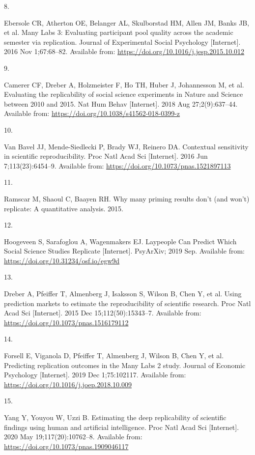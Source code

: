 \documentclass[
  english,
  a4paper,
]{article}
\newlength{\cslhangindent}
\newlength{\csllabelwidth}
\newenvironment{CSLReferences}[2] %
{\begin{list}{}{%
			\setlength{\itemindent}{0pt}
			\setlength{\leftmargin}{0pt}
			\setlength{\parsep}{0pt}
			\ifodd #1
			\setlength{\leftmargin}{\cslhangindent}
			\setlength{\itemindent}{-1\cslhangindent}
			\fi
			\setlength{\itemsep}{#2\baselineskip}}}
	{\end{list}}
\newcommand{\CSLLeftMargin}[1]{\parbox[t]{\csllabelwidth}{\strut#1\strut}}
\newcommand{\CSLRightInline}[1]{\parbox[t]{\linewidth - \csllabelwidth}{\strut#1\strut}}
\begin{document}
\begin{CSLReferences}{0}{1}
\CSLLeftMargin{8. }%
\CSLRightInline{Ebersole CR, Atherton OE, Belanger AL, Skulborstad HM, Allen JM, Banks JB, et al. Many {Labs} 3: {Evaluating} participant pool quality across the academic semester via replication. Journal of Experimental Social Psychology {[}Internet{]}. 2016 Nov 1;67:68--82. Available from: \url{https://doi.org/10.1016/j.jesp.2015.10.012}}

\CSLLeftMargin{9. }%
\CSLRightInline{Camerer CF, Dreber A, Holzmeister F, Ho TH, Huber J, Johannesson M, et al. Evaluating the replicability of social science experiments in {Nature} and {Science} between 2010 and 2015. Nat Hum Behav {[}Internet{]}. 2018 Aug 27;2(9):637--44. Available from: \url{https://doi.org/10.1038/s41562-018-0399-z}}

\CSLLeftMargin{10. }%
\CSLRightInline{Van Bavel JJ, Mende-Siedlecki P, Brady WJ, Reinero DA. Contextual sensitivity in scientific reproducibility. Proc Natl Acad Sci {[}Internet{]}. 2016 Jun 7;113(23):6454--9. Available from: \url{https://doi.org/10.1073/pnas.1521897113}}

\CSLLeftMargin{11. }%
\CSLRightInline{Ramscar M, Shaoul C, Baayen RH. Why many priming results don't (and won't) replicate: {A} quantitative analysis. 2015. }

\CSLLeftMargin{12. }%
\CSLRightInline{Hoogeveen S, Sarafoglou A, Wagenmakers EJ. Laypeople {Can Predict Which Social Science Studies Replicate} {[}Internet{]}. {PsyArXiv}; 2019 Sep. Available from: \url{https://doi.org/10.31234/osf.io/egw9d}}

\CSLLeftMargin{13. }%
\CSLRightInline{Dreber A, Pfeiffer T, Almenberg J, Isaksson S, Wilson B, Chen Y, et al. Using prediction markets to estimate the reproducibility of scientific research. Proc Natl Acad Sci {[}Internet{]}. 2015 Dec 15;112(50):15343--7. Available from: \url{https://doi.org/10.1073/pnas.1516179112}}

\CSLLeftMargin{14. }%
\CSLRightInline{Forsell E, Viganola D, Pfeiffer T, Almenberg J, Wilson B, Chen Y, et al. Predicting replication outcomes in the {Many Labs} 2 study. Journal of Economic Psychology {[}Internet{]}. 2019 Dec 1;75:102117. Available from: \url{https://doi.org/10.1016/j.joep.2018.10.009}}

\CSLLeftMargin{15. }%
\CSLRightInline{Yang Y, Youyou W, Uzzi B. Estimating the deep replicability of scientific findings using human and artificial intelligence. Proc Natl Acad Sci {[}Internet{]}. 2020 May 19;117(20):10762--8. Available from: \url{https://doi.org/10.1073/pnas.1909046117}}


\end{CSLReferences}
\end{document}

